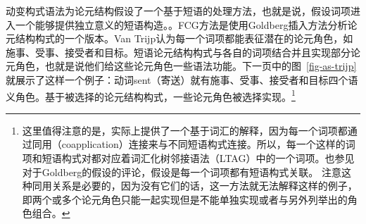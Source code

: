 动变构式语法为论元结构假设了一个基于短语的处理方法，也就是说，假设词项进入一个能够提供独立意义的短语构造。\citep{vanTrijp2011a}。FCG方法是使用Goldberg插入方法分析论元结构构式的一个版本\citep{Goldberg95a}。Van Trijp认为每一个词项都能表征潜在的论元角色，如施事、受事、接受者和目标。短语论元结构构式与各自的词项结合并且实现部分论元角色，也就是说他们给这些论元角色一些语法功能。下一页中的图~\vref{fig-as-trijp}就展示了这样一个例子：动词sent（寄送）就有施事、受事、接受者和目标四个语义角色。基于被选择的论元结构构式，一些论元角色被选择实现。\footnote{
这里值得注意的是，\citet[]{vanTrijp2011a}实际上提供了一个基于词汇的解释，因为每一个词项都通过同用（coapplication）连接来与不同短语构式连接。所以，每一个这样的词项和短语构式对都对应着词汇化树邻接语法（LTAG）中的一个词项。也参见对于Goldberg的假设的评论，假设是每一个词项都有短语构式关联。
注意这种同用关系是必要的，因为没有它们的话，这一方法就无法解释这样的例子，即两个或多个论元角色只能一起实现但是不能单独实现或者与另外列举出的角色组合。
}

